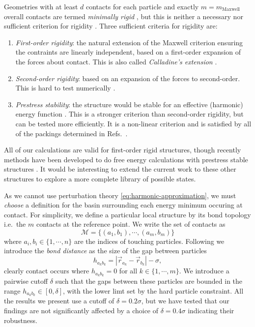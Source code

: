 \documentclass[11pt,twoside]{report}
\begin{document}
Geometries with at least $d$ contacts for each particle and exactly $m = m_\mathrm{Maxwell}$ overall contacts are termed \emph{minimally rigid} \cite{ArkusPRL2009}, but this is neither a necessary nor sufficient criterion for rigidity \cite{Holmes-CerfonARCMP2017}.
Three sufficient criteria for rigidity are: \cite{ConnellySJDM1996,Holmes-CerfonARCMP2017}
\begin{enumerate}
\item \emph{First-order rigidity}: the natural extension of the Maxwell criterion ensuring the contraints are linearly independent, based on a first-order expansion of the forces about contact.
  This is also called \emph{Calladine's extension} \cite{CalladineIJSS1978}.
\item \emph{Second-order rigidity}: based on an expansion of the forces to second-order.
  This is hard to test numerically \cite{Holmes-CerfonARCMP2017}.
\item \emph{Prestress stability}: the structure would be stable for an effective (harmonic) energy function \cite{ConnellySJDM1996}.
  This is a stronger criterion than second-order rigidity, but can be tested more efficiently.
  It is a non-linear criterion and is satisfied by all of the packings determined in Refs.\ \cite{ArkusPRL2009,Holmes-CerfonSR2016}.
\end{enumerate}
All of our calculations are valid for first-order rigid structures, though recently methods have been developed to do free energy calculations with prestress stable structures \cite{KallusPRE2017}.
It would be interesting to extend the current work to these other structures to explore a more complete library of possible states.

As we cannot use perturbation theory \eqref{eq:harmonic-approximation}, we must \emph{choose} a definition for the basin surrounding each energy minimum occuring at contact.
For simplicity, we define a particular local structure by its bond topology i.e.\ the $m$ contacts at the reference point.
We write the set of contacts as
\begin{equation}\label{eq:structure-contacts}
  \mathcal{M} = \{(a_1, b_1), \cdots, (a_m, b_m)\}
\end{equation}
where $a_i, b_i \in \{1, \cdots, n\}$ are the indices of touching particles.
Following \cite{Holmes-CerfonPNAS2013} we introduce the \emph{bond distance} as the size of the gap between particles
\begin{equation}\label{eq:bond-distance}
  h_{a_k b_k} = |\vec{r}_{a_k} - \vec{r}_{b_k}| - \sigma,
\end{equation}
clearly contact occurs where $h_{a_k b_k} = 0$ for all $k \in \{1, \cdots, m\}$.
We introduce a pairwise cutoff $\delta$ such that the gaps between these particles are bounded in the range $h_{a_k b_k} \in [0, \delta]$, with the lower limt set by the hard particle constraint.
All the results we present use a cutoff of $\delta = 0.2 \sigma$, but we have tested that our findings are not significantly affected by a choice of $\delta = 0.4 \sigma$ indicating their robustness.
\end{document}
